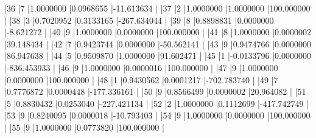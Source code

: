\documentclass{article}
\begin{document}
\begin{Schunk}
\begin{Soutput}
|36        |7  |1.0000000  |0.0968655 |-11.613634  |
|37        |2  |1.0000000  |1.0000000 |100.000000  |
|38        |3  |0.7020952  |0.3133165 |-267.634044 |
|39        |8  |0.8898831  |0.0000000 |-8.621272   |
|40        |9  |1.0000000  |0.0000000 |100.000000  |
|41        |8  |1.0000000  |0.0000002 |39.148434   |
|42        |7  |0.9423744  |0.0000000 |-50.562141  |
|43        |9  |0.9474766  |0.0000000 |86.947638   |
|44        |5  |0.9509870  |1.0000000 |91.602471   |
|45        |1  |-0.0133796 |0.0000000 |-836.453933 |
|46        |9  |1.0000000  |0.0000016 |100.000000  |
|47        |9  |1.0000000  |0.0000000 |100.000000  |
|48        |1  |0.9430562  |0.0001217 |-702.783740 |
|49        |7  |0.7776872  |0.0000448 |-177.336161 |
|50        |9  |0.8566499  |0.0000002 |20.964082   |
|51        |5  |0.8830432  |0.0253040 |-227.421134 |
|52        |2  |1.0000000  |0.1112699 |-417.742749 |
|53        |9  |0.8240095  |0.0000018 |-10.793403  |
|54        |9  |1.0000000  |0.0000000 |100.000000  |
|55        |9  |1.0000000  |0.0773820 |100.000000  |
\end{Soutput}
\end{Schunk}
\end{document}
